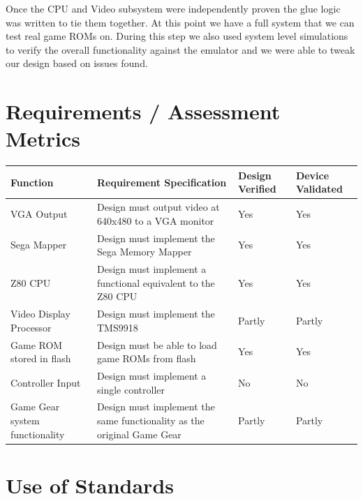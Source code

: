 \documentclass{article}
\begin{document}
Once the CPU and Video subsystem were independently proven the glue logic was
written to tie them together. At this point we have a full system that we can
test real game ROMs on. During this step we also used system level simulations
to verify the overall functionality against the emulator and we were able to
tweak our design based on issues found.


\section{Requirements / Assessment Metrics}

\begin{tabular}{L{1.75in}L{2.75in}C{0.6in}C{0.7in}}
    \toprule
    \textbf{Function} & \textbf{Requirement Specification} & \textbf{Design Verified} & \textbf{Device Validated}\\
    \midrule
    VGA Output               & Design must output video at 640x480 to a VGA monitor & {\color{darkgreen} Yes}     & {\color{darkgreen} Yes} \\
    Sega Mapper              & Design must implement the Sega Memory Mapper         & {\color{darkgreen} Yes}     & {\color{darkgreen} Yes} \\
    Z80 CPU                  & Design must implement a functional equivalent to the Z80 CPU & {\color{darkgreen} Yes}     & {\color{darkgreen} Yes} \\
    Video Display Processor  & Design must implement the TMS9918                    & {\color{darkyellow} Partly} & {\color{darkyellow} Partly} \\
    Game ROM stored in flash & Design must be able to load game ROMs from flash     & {\color{darkgreen} Yes}     & {\color{darkgreen} Yes} \\
    Controller Input         & Design must implement a single controller            & {\color{darkred} No}        & {\color{darkred} No} \\
    Game Gear system functionality & Design must implement the same functionality as the original Game Gear & {\color{darkyellow}Partly} & {\color{darkyellow}Partly} \\
    \bottomrule
\end{tabular}

\section{Use of Standards}
\end{document}
